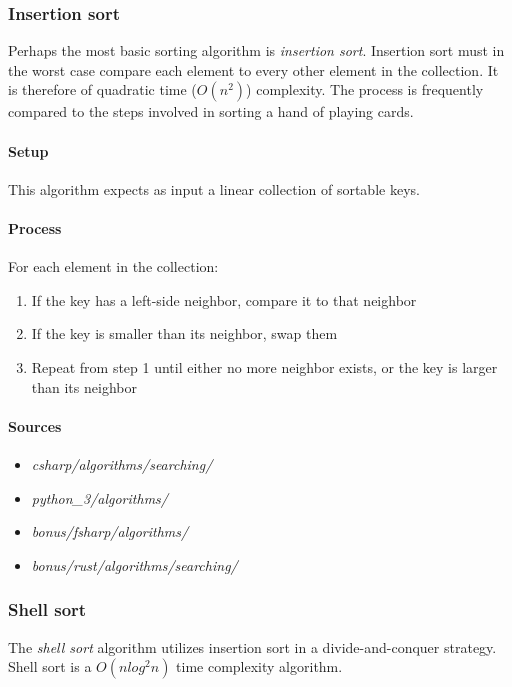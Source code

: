 \documentclass{article}
\begin{document}
\subsubsection{Insertion sort}
Perhaps the most basic sorting algorithm is {\em insertion sort}. Insertion sort must in the worst case compare
each element to every other element in the collection. It is therefore of quadratic time (\(O(n^2)\)) complexity.
The process is frequently compared to the steps involved in sorting a hand of playing cards.

\paragraph{Setup}
This algorithm expects as input a linear collection of sortable keys.

\paragraph{Process}
For each element in the collection:
\begin{enumerate}
\item{If the key has a left-side neighbor, compare it to that neighbor}
\item{If the key is smaller than its neighbor, swap them}
\item{Repeat from step 1 until either no more neighbor exists, or the key is larger than its neighbor}
\end{enumerate}

\begin{samepage}
  \paragraph{Sources}
  \begin{itemize}
  \item{{\em csharp/algorithms/searching/}}
  \item{{\em python\_3/algorithms/}}
  \item{{\em bonus/fsharp/algorithms/}}
  \item{{\em bonus/rust/algorithms/searching/}}
  \end{itemize}
\end{samepage}

\subsubsection{Shell sort}
The {\em shell sort} algorithm utilizes insertion sort in a divide-and-conquer strategy.
Shell sort is a \(O(n log^2 n)\) time complexity algorithm.
\end{document}
